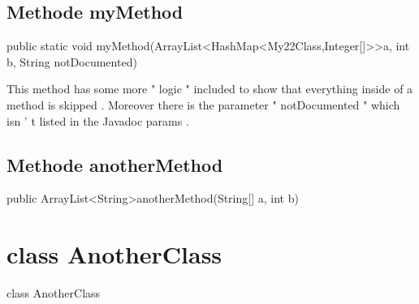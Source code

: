 \documentclass[12pt]{scrreprt}
\begin{document}
\section{Methode myMethod}
\label{examples.SimpleExample:myMethod}




public static void myMethod(ArrayList\textless HashMap\textless My22Class,Integer[]\textgreater \textgreater  a, int b, String notDocumented)


This method has some more " logic " included to show that everything inside of a method is skipped . Moreover there is the parameter " notDocumented " which isn ' t listed in the Javadoc params .



\section{Methode anotherMethod}
\label{examples.SimpleExample:anotherMethod}




public ArrayList\textless String\textgreater  anotherMethod(String[] a, int b)






\chapter{class AnotherClass}
\label{examples.AnotherClass}




 class AnotherClass
\end{document}
